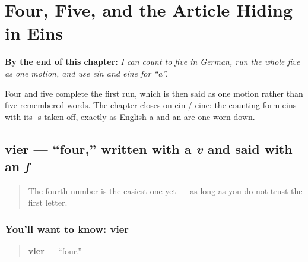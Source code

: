 
\chapter{Four, Five, and the Article Hiding in Eins}
\label{ch:ge-zahlen-4-5}

\begin{chapteropening}
\textbf{By the end of this chapter:} \emph{I can count to five in German, run the whole five as one motion, and use ein and eine for “a”.}

Four and five complete the first run, which is then said as one motion rather than five remembered words. The chapter closes on ein / eine: the counting form eins with its -s taken off, exactly as English a and an are one worn down.
\end{chapteropening}

\section[vier]{vier — \textquotedblleft{}four,\textquotedblright{} written with a \emph{v} and said with an \emph{f}}

\label{lesson:GE-C06-vier}



\begin{quote}
The fourth number is the easiest one yet — as long as you do not trust the first letter.
\end{quote}

\subsection*{You'll want to know: vier}
\begin{quote}
\textbf{vier} — \textquotedblleft{}four.\textquotedblright{}
\end{quote}

